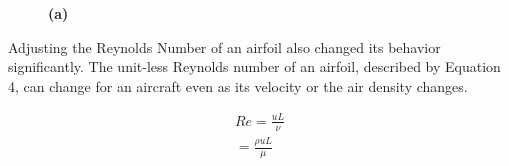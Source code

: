 \documentclass{article}
\begin{document}
\begin{figure}
  \centering
  \caption{ \textbf{(a)} }
  \label{run5}
\end{figure}

Adjusting the Reynolds Number of an airfoil also changed its behavior significantly. The unit-less Reynolds number of an airfoil, described by Equation 4, can change for an aircraft even as its velocity or the air density changes.

\begin{equation} \label{eq:4}
\begin{aligned}
        	Re = \frac{uL}{\nu} \\
	= \frac{\rho uL}{\mu} 
\end{aligned}
\end{equation}
\newline
\end{document}
